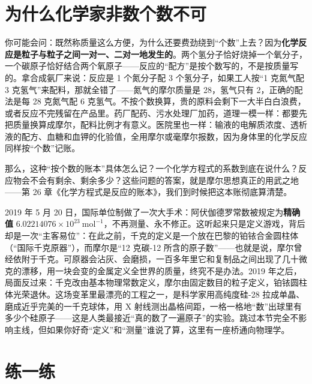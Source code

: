 \section{为什么化学家非数个数不可}

你可能会问：既然称质量这么方便，为什么还要费劲绕到“个数”上去？因为\textbf{化学反应是粒子与粒子之间一对一、二对一地发生的}。两个氢分子恰好烧掉一个氧分子，一个碳原子恰好结合两个氧原子——反应的“配方”是按个数写的，不是按质量写的。拿合成氨厂来说：反应是 1 个氮分子配 3 个氢分子，如果工人按“1 克氮气配 3 克氢气”来配料，那就全错了——氮气的摩尔质量是 28，氢气只有 2，正确的配法是每 28 克氮气配 6 克氢气。不按个数换算，贵的原料会剩下一大半白白浪费，或者反应不完残留在产品里。药厂配药、污水处理厂加药，道理一模一样：都要先把质量换算成摩尔，配料比例才有意义。医院里也一样：输液的电解质浓度、透析液的配方、血糖和血钾的化验值，全用摩尔或毫摩尔报数，因为身体里的化学反应同样按“个数”记账。

那么，这种“按个数的账本”具体怎么记？一个化学方程式的系数到底在说什么？反应物会不会有剩余、剩余多少？这些问题的答案，就是摩尔思想真正的用武之地——第 26 章《化学方程式是反应的账本》，我们到时候把这本账彻底算清楚。

\begin{tiaozhan}
2019 年 5 月 20 日，国际单位制做了一次大手术：阿伏伽德罗常数被规定为\textbf{精确值} $6.02214076\times 10^{23}\ \mathrm{mol^{-1}}$，不再测量、永不修正。这听起来只是定义游戏，背后却是一次“主客易位”：在此之前，千克的定义是一个放在巴黎的铂铱合金圆柱体（“国际千克原器”），而摩尔是“12 克碳-12 所含的原子数”——也就是说，摩尔曾经依附于千克。可原器会沾灰、会磨损，一百多年里它和复制品之间出现了几十微克的漂移，用一块会变的金属定义全世界的质量，终究不是办法。2019 年之后，局面反过来：千克改由基本物理常数定义，摩尔由固定数目的粒子定义，铂铱圆柱体光荣退休。这场变革里最漂亮的工程之一，是科学家用高纯度硅-28 拉成单晶、磨成近乎完美的一千克球体，用 X 射线测出晶格间距，一格一格地“数”出球里有多少个硅原子——这是人类最接近“真的数了一遍原子”的实验。跳过本节完全不影响主线，但如果你好奇“定义”和“测量”谁说了算，这里有一座桥通向物理学。
\end{tiaozhan}

\section*{练一练}

